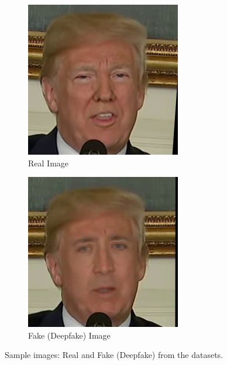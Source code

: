 \documentclass{article}
\begin{document}
\begin{figure}[h!]
    \centering
    \begin{subfigure}{0.45\textwidth}
        \includegraphics[width=\textwidth]{real.png}
        \caption{Real Image}
        \label{fig:real_image}
    \end{subfigure}
    \hfill
    \begin{subfigure}{0.45\textwidth}
        \includegraphics[width=\textwidth]{fake.png}
        \caption{Fake (Deepfake) Image}
        \label{fig:fake_image}
    \end{subfigure}
    \caption{Sample images: Real and Fake (Deepfake) from the datasets.}
    \label{fig:sample_images}
\end{figure}
\end{document}
